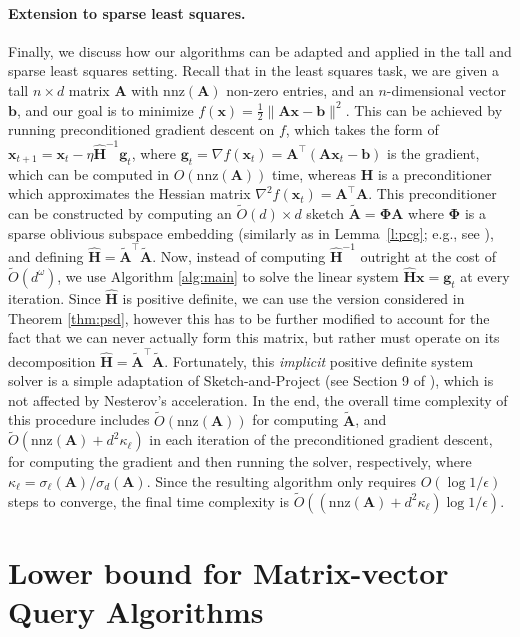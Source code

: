 \documentclass[11pt]{article}
\let\origtop\top
\renewcommand\top{{\scriptscriptstyle{\origtop}}}
\def\nnz{\mathrm{nnz}}
\def\x{{\mathbf x}}
\def\g{{\mathbf g}}
\def\b{{\mathbf b}}
\def\A{{\mathbf A}}
\def\H{{\mathbf H}}
\begin{document}
\paragraph{Extension to sparse least squares.}
Finally, we discuss how our algorithms can be adapted and applied in the tall and sparse least squares setting. Recall that in the least squares task, we are given a tall $n\times d$ matrix $\A$ with $\nnz(\A)$ non-zero entries, and an $n$-dimensional vector $\b$, and our goal is to minimize $f(\x)=\frac12\|\A\x-\b\|^2$. This can be achieved by running preconditioned gradient descent on $f$, which takes the form of $\x_{t+1} = \x_t - \eta\hat\H^{-1}\g_t$, where $\g_t=\nabla f(\x_t)=\A^\top(\A\x_t-\b)$ is the gradient, which can be computed in $O(\nnz(\A))$ time, whereas $\hat\H$ is a preconditioner which approximates the Hessian matrix $\nabla^2f(\x_t) = \A^\top\A$. This preconditioner can be constructed by computing an $\tilde O(d)\times d$ sketch $\tilde\A=\mathbf{\Phi}\A$ where $\mathbf{\Phi}$ is a sparse oblivious subspace embedding (similarly as in Lemma~\ref{l:pcg}; e.g., see \cite{chenakkod2023optimal}), and defining $\hat\H=\tilde\A^\top\tilde\A$. Now, instead of computing $\hat\H^{-1}$ outright at the cost of $\tilde O(d^\omega)$, we use Algorithm \ref{alg:main} to solve the linear system $\hat\H\x = \g_t$ at every iteration. Since $\hat\H$ is positive definite, we can use the version considered in Theorem \ref{thm:psd}, however this has to be further modified to account for the fact that we can never actually form this matrix, but rather must operate on its decomposition $\hat\H=\tilde\A^\top\tilde\A$. Fortunately, this \emph{implicit} positive definite system solver is a simple adaptation of Sketch-and-Project (see Section 9 of \cite{derezinski2023solving}), which is not affected by Nesterov's acceleration. In the end, the overall time complexity of this procedure includes $\tilde O(\nnz(\A))$ for computing $\tilde\A$, and $\tilde O(\nnz(\A) + d^2\kappa_\ell)$ in each iteration of the preconditioned gradient descent, for computing the gradient and then running the solver, respectively, where $\kappa_\ell=\sigma_\ell(\A)/\sigma_d(\A)$. Since the resulting algorithm only requires $O(\log1/\epsilon)$ steps to converge, the final time complexity is $\tilde O((\nnz(\A)+d^2\kappa_\ell)\log1/\epsilon)$.



\section{Lower bound for Matrix-vector Query Algorithms}
\label{s:lower}
\end{document}
